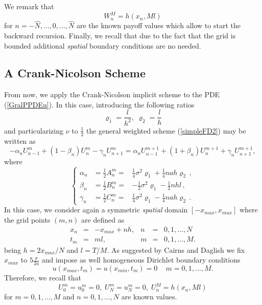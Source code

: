 We remark that
$$
W^M_n = h(x_n, Ml)
$$
for $ n = -\hat{N}, \dots, 0 , \dots, \hat{N}$ are the known payoff
values which allow to start the backward recursion. Finally, we recall
that due to the fact that the grid is bounded additional {\sl spatial}
boundary conditions are no needed. 
\subsection{A Crank-Nicolson   Scheme} From now, we apply the 
Crank-Nicolson implicit scheme to the PDE 
(\ref{GralPPDEu}). In this case, introducing the following ratios
$$
\varrho_1 = \frac{l}{h^2}, \; \varrho_2 = \frac{l}{h}
$$
and particularizing $\nu$ to $\frac{1}{2}$ the general weighted scheme
(\ref{simpleFD2}) may be written as 
\begin{equation}
\label{CNsimpleFDu}
 -\alpha_n U^m_{n-1}+ \left(1-\beta_n \right)
U^m_n - \gamma_n U^m_{n+1} = %
\alpha_n U^{m+1}_{n-1} + \left( 1+ \beta_n \right)
U^{m+1}_n + \gamma_n U^{m+1}_{n+1},
\end{equation}
where
\begin{equation}
\left\{
\begin{array}{rcl}
\label{CNFDcoef}
\nonumber 
\alpha_n & = \frac{1}{2} A^m_n =  & \frac{1}{4} \sigma^2\varrho_1 +
\frac{1}{4} n a h \varrho_2 \, ,\\  
\beta_n   & = \frac{1}{2} B^m_n =  & -\frac{1}{2} \sigma^2 \varrho_1 -
\frac{1}{2} n h l \, ,\\
\nonumber 
\gamma_n & = \frac{1}{2} C^m_n = & \frac{1}{4} \sigma^2 \varrho_1 -
\frac{1}{4} n a h \varrho_2\, .  
\end{array}
\right.
\end{equation}
In this case, we consider again a symmetric {\sl spatial} domain
$[-x_{max},x_{max}]$ where the grid points $(m,n)$ are defined as
\begin{equation}
\begin{array}{rclrcl}
x_n & = & -x_{max} + n h,  &n & = & 0, 1, \dots, N\\ 
t_m & = & m l,  & m &= &0, 1, \dots, M.
\end{array}
\end{equation}
being $h = 2 x_{max} / N$ and $l = T / M$. As suggested by Cairns
\cite{C:2004} and Daglish \cite{D:2010} we fix $x_{max}$ to
$5\frac{\sigma}{2 a}$ and impose as well homogeneous Dirichlet
boundary conditions 
\begin{equation}
u(x_{max} , t_m) = u(x_{min} , t_m) = 0 \, \quad m=0,1, \dots, M.
\end{equation}
Therefore, we recall that
$$
U^m_0 = u^m_0 = 0,\; U^m_N = u^m_N = 0, \; U^M_n = h(x_n , Ml)
$$
for $m = 0,1, \dots , M$ and $n = 0, 1, \dots, N$ are known values. 

